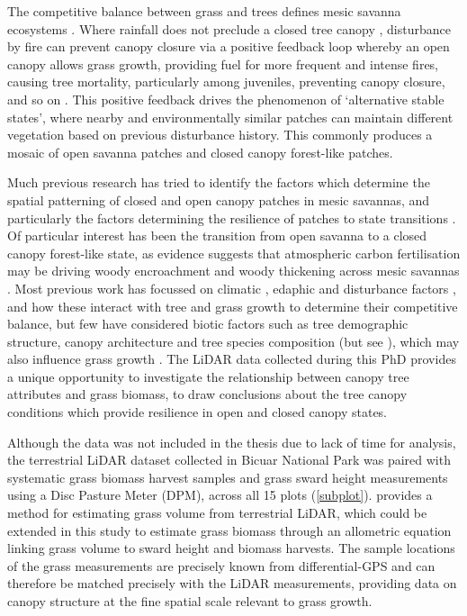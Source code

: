 \begin{refsection}
The competitive balance between grass and trees defines mesic savanna ecosystems \citep{Frost1996}. Where rainfall does not preclude a closed tree canopy \citep{Sankaran2005}, disturbance by fire can prevent canopy closure via a positive feedback loop whereby an open canopy allows grass growth, providing fuel for more frequent and intense fires, causing tree mortality, particularly among juveniles, preventing canopy closure, and so on \citep{Staver2011}. This positive feedback drives the phenomenon of `alternative stable states', where nearby and environmentally similar patches can maintain different vegetation based on previous disturbance history. This commonly produces a mosaic of open savanna patches and closed canopy forest-like patches. 

Much previous research has tried to identify the factors which determine the spatial patterning of closed and open canopy patches in mesic savannas, and particularly the factors determining the resilience of patches to state transitions \citep{Devine2017, Case2016, Hirota2011}. Of particular interest has been the transition from open savanna to a closed canopy forest-like state, as evidence suggests that atmospheric carbon fertilisation may be driving woody encroachment and woody thickening across mesic savannas \citep{Stevens2017}. Most previous work has focussed on climatic \citep{Case2020}, edaphic \citep{Colgan2012} and disturbance factors \citep{Case2016}, and how these interact with tree and grass growth to determine their competitive balance, but few have considered biotic factors such as tree demographic structure, canopy architecture and tree species composition (but see \citealt{Pilon2020}), which may also influence grass growth \citep{Jennings1999}. The LiDAR data collected during this PhD provides a unique opportunity to investigate the relationship between canopy tree attributes and grass biomass, to draw conclusions about the tree canopy conditions which provide resilience in open and closed canopy states.

Although the data was not included in the thesis due to lack of time for analysis, the terrestrial LiDAR dataset collected in Bicuar National Park was paired with systematic grass biomass harvest samples and grass sward height measurements using a Disc Pasture Meter (DPM), across all 15 plots (\autoref{subplot}). \citet{Cooper2017} provides a method for estimating grass volume from terrestrial LiDAR, which could be extended in this study to estimate grass biomass through an allometric equation linking grass volume to sward height and biomass harvests. The sample locations of the grass measurements are precisely known from differential-GPS and can therefore be matched precisely with the LiDAR measurements, providing data on canopy structure at the fine spatial scale relevant to grass growth. 


\end{refsection}
